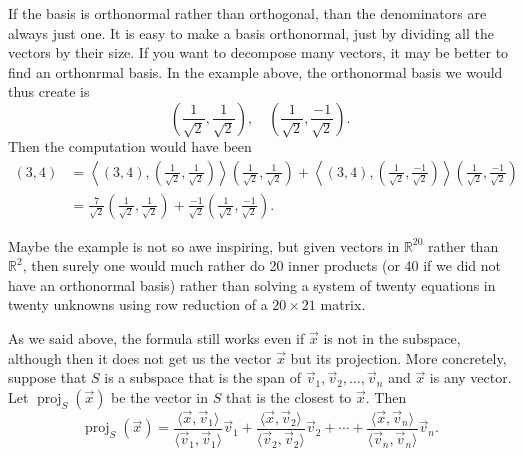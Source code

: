 \documentclass{ximera}
\begin{document}
If the basis is orthonormal rather than orthogonal, than the denominators are always just one.  It is easy to make a basis orthonormal, just by dividing all the vectors by their size.  If you want to decompose many vectors, it may be better to find an orthonrmal basis. In the example above, the orthonormal basis we would thus create is
\begin{equation*}
    \left( \frac{1}{\sqrt{2}} , \frac{1}{\sqrt{2}} \right) , \quad
    \left( \frac{1}{\sqrt{2}} , \frac{-1}{\sqrt{2}} \right) .
\end{equation*}
Then the computation would have been
\begin{equation*}
    \begin{split}
        (3,4)
        & = \left\langle (3,4), \left( \frac{1}{\sqrt{2}} , \frac{1}{\sqrt{2}} \right) \right\rangle \left( \frac{1}{\sqrt{2}} , \frac{1}{\sqrt{2}} \right)
        + \left\langle (3,4), \left( \frac{1}{\sqrt{2}} , \frac{-1}{\sqrt{2}} \right) \right\rangle \left( \frac{1}{\sqrt{2}} , \frac{-1}{\sqrt{2}} \right) \\
        & = \frac{7}{\sqrt{2}} \left( \frac{1}{\sqrt{2}} , \frac{1}{\sqrt{2}} \right) + \frac{-1}{\sqrt{2}} \left( \frac{1}{\sqrt{2}} , \frac{-1}{\sqrt{2}} \right) .
    \end{split}
\end{equation*}

Maybe the example is not so awe inspiring, but given vectors in ${\mathbb{R}}^{20}$ rather than ${\mathbb{R}}^2$, then surely one would much rather do 20 inner products (or 40 if we did not have an orthonormal basis) rather than solving a system of twenty equations in twenty unknowns using row reduction of a $20 \times 21$ matrix.

As we said above, the formula still works even if $\vec{x}$ is not in the subspace, although then it does not get us the vector $\vec{x}$ but its projection.  More concretely, suppose that $S$ is a subspace that is the span of $\vec{v}_1,\vec{v}_2,\ldots,\vec{v}_n$ and $\vec{x}$ is any vector.  Let $\operatorname{proj}_{S}(\vec{x})$ be the vector in $S$ that is the closest to $\vec{x}$.  Then
\begin{equation*}
    \operatorname{proj}_{S}(\vec{x}) = 
    \frac{
        \langle \vec{x}, \vec{v}_1 \rangle
        }{
        \langle \vec{v}_1, \vec{v}_1 \rangle 
        } 
    \vec{v}_1 + 
    \frac{
        \langle \vec{x}, \vec{v}_2 \rangle
        }{
        \langle \vec{v}_2, \vec{v}_2 \rangle
        } 
    \vec{v}_2 + \cdots + 
    \frac{
        \langle \vec{x}, \vec{v}_n \rangle
        }{
        \langle \vec{v}_n, \vec{v}_n \rangle
        } 
    \vec{v}_n .
\end{equation*}
\end{document}
